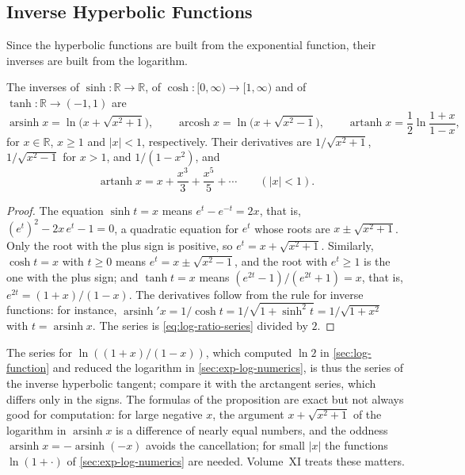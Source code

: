 \subsection{Inverse Hyperbolic Functions}

Since the hyperbolic functions are built from the exponential function, their inverses are built from the logarithm.

\begin{proposition}
\label{prop:inverse-hyperbolic}
The inverses of $\sinh\colon\mathbb R\to\mathbb R$, of $\cosh\colon[0,\infty)\to[1,\infty)$ and of $\tanh\colon\mathbb R\to(-1,1)$ are
\[
\operatorname{arsinh}x=\ln\bigl(x+\sqrt{x^2+1}\bigr),\qquad\operatorname{arcosh}x=\ln\bigl(x+\sqrt{x^2-1}\bigr),\qquad\operatorname{artanh}x=\frac12\ln\frac{1+x}{1-x},
\]
for $x\in\mathbb R$, $x\ge1$ and $|x|<1$, respectively. Their derivatives are $1/\sqrt{x^2+1}$, $1/\sqrt{x^2-1}$ for $x>1$, and $1/(1-x^2)$, and
\[
\operatorname{artanh}x=x+\frac{x^3}3+\frac{x^5}5+\cdots\qquad(|x|<1).
\]
\end{proposition}

\begin{proof}
The equation $\sinh t=x$ means $e^t-e^{-t}=2x$, that is, $(e^t)^2-2x\,e^t-1=0$, a quadratic equation for $e^t$ whose roots are $x\pm\sqrt{x^2+1}$. Only the root with the plus sign is positive, so $e^t=x+\sqrt{x^2+1}$. Similarly, $\cosh t=x$ with $t\ge0$ means $e^t=x\pm\sqrt{x^2-1}$, and the root with $e^t\ge1$ is the one with the plus sign; and $\tanh t=x$ means $(e^{2t}-1)/(e^{2t}+1)=x$, that is, $e^{2t}=(1+x)/(1-x)$. The derivatives follow from the rule for inverse functions: for instance, $\operatorname{arsinh}'x=1/\cosh t=1/\sqrt{1+\sinh^2t}=1/\sqrt{1+x^2}$ with $t=\operatorname{arsinh}x$. The series is \eqref{eq:log-ratio-series} divided by $2$.
\end{proof}

The series for $\ln((1+x)/(1-x))$, which computed $\ln2$ in \cref{sec:log-function} and reduced the logarithm in \cref{sec:exp-log-numerics}, is thus the series of the inverse hyperbolic tangent; compare it with the arctangent series, which differs only in the signs. The formulas of the proposition are exact but not always good for computation: for large negative $x$, the argument $x+\sqrt{x^2+1}$ of the logarithm in $\operatorname{arsinh}x$ is a difference of nearly equal numbers, and the oddness $\operatorname{arsinh}x=-\operatorname{arsinh}(-x)$ avoids the cancellation; for small $|x|$ the functions $\ln(1+\cdot)$ of \cref{sec:exp-log-numerics} are needed. Volume~XI treats these matters.


